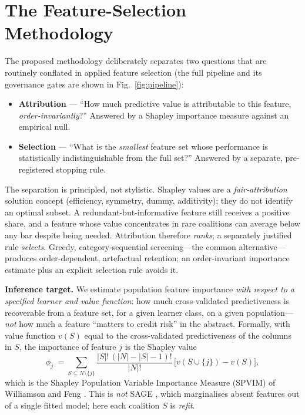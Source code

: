 \documentclass[9pt,journal]{IEEEtai}
\begin{document}
\section{The Feature-Selection Methodology}\label{sec:sharp}
The proposed methodology deliberately separates two questions that are
routinely conflated in applied feature selection (the full pipeline and its governance gates are
shown in Fig.~\ref{fig:pipeline}):

\begin{itemize}
\item \textbf{Attribution} --- ``How much predictive value is attributable to this feature,
\emph{order-invariantly}?'' Answered by a Shapley importance measure against an empirical
null.
\item \textbf{Selection} --- ``What is the \emph{smallest} feature set whose performance is
statistically indistinguishable from the full set?'' Answered by a separate, pre-registered
stopping rule.
\end{itemize}

The separation is principled, not stylistic. Shapley values are a \emph{fair-attribution}
solution concept (efficiency, symmetry, dummy, additivity); they do not identify an optimal
subset. A redundant-but-informative feature still receives a positive share, and a feature
whose value concentrates in rare coalitions can average below any bar despite being needed.
Attribution therefore \emph{ranks}; a separately justified rule \emph{selects}. Greedy,
category-sequential screening---the common alternative---produces order-dependent, artefactual
retention; an order-invariant importance estimate plus an explicit selection rule avoids it.

\textbf{Inference target.} We estimate population feature importance \emph{with respect to a
specified learner and value function}: how much cross-validated predictiveness is recoverable
from a feature set, for a given learner class, on a given population---\emph{not} how much a
feature ``matters to credit risk'' in the abstract. Formally, with value function $v(S)$ equal
to the cross-validated predictiveness of the columns in $S$, the importance of feature $j$ is
the Shapley value
\begin{equation}
\phi_j \;=\!\!\sum_{S\subseteq N\setminus\{j\}}\!\!
\frac{|S|!\,(|N|-|S|-1)!}{|N|!}\,\bigl[v(S\cup\{j\})-v(S)\bigr],
\label{eq:shapley}
\end{equation}
which is the Shapley Population Variable Importance Measure (SPVIM) of Williamson and Feng
\cite{williamson2020spvim}. This is \emph{not} SAGE \cite{covert2020sage}, which marginalises
absent features out of a single fitted model; here each coalition $S$ is \emph{refit}.
\end{document}
